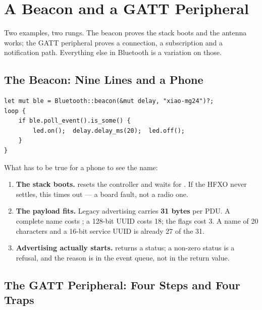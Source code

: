 \section{A Beacon and a GATT Peripheral}
\label{sec:ble-beacon}

Two examples, two rungs. The beacon proves the stack boots and the antenna works; the GATT peripheral
proves a connection, a subscription and a notification path. Everything else in Bluetooth is a
variation on those.

\subsection{The Beacon: Nine Lines and a Phone}

\begin{verbatim}
let mut ble = Bluetooth::beacon(&mut delay, "xiao-mg24")?;
loop {
    if ble.poll_event().is_some() {
        led.on();  delay.delay_ms(20);  led.off();
    }
}
\end{verbatim}

What has to be true for a phone to see the name:

\begin{enumerate}
    \item \textbf{The stack boots.}  resets the controller and waits for
          . If the HFXO never settles, this times out — a board fault, not a
          radio one.
    \item \textbf{The payload fits.} Legacy advertising carries \textbf{31 bytes} per PDU. A complete
          name costs ; a 128-bit UUID costs 18; the flags cost 3. A name of 20
          characters and a 16-bit service UUID is already 27 of the 31.
    \item \textbf{Advertising actually starts.}  returns a status; a
          non-zero status is a refusal, and the reason is in the event queue, not in the return value.
\end{enumerate}

\subsection{The GATT Peripheral: Four Steps and Four Traps}


